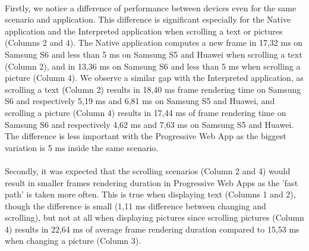 \documentclass{kththesis}
\begin{document}
\paragraph{}
Firstly, we notice a difference of performance between devices even for the same scenario and application. This difference is significant especially for the Native application and the Interpreted application when scrolling a text or pictures (Columns 2 and 4). The Native application computes a new frame in 17,32 ms on Samsung S6 and less than 5 ms on Samsung S5 and Huawei when scrolling a text (Column 2), and in 13,36 ms on Samsung S6 and less than 5 ms when scrolling a picture (Column 4). We observe a similar gap with the Interpreted application, as scrolling a text (Column 2) results in 18,40 ms frame rendering time on Samsung S6 and respectively 5,19 ms and 6,81 ms on Samsung S5 and Huawei, and scrolling a picture (Column 4) results in 17,44 ms of frame rendering time on Samsung S6 and respectively 4,62 ms and 7,63 ms on Samsung S5 and Huawei. \newline
The difference is less important with the Progressive Web App as the biggest variation is 5 ms inside the same scenario. 


\paragraph{}
Secondly, it was expected that the scrolling scenarios (Column 2 and 4) would result in smaller frames rendering duration in Progressive Web Apps as the 'fast path' is taken more often. This is true when displaying text (Columns 1 and 2), though the difference is small (1,11 ms difference between changing and scrolling), but not at all when displaying pictures since scrolling pictures (Column 4) results in 22,64 ms of average frame rendering duration compared to 15,53 ms when changing a picture (Column 3). 
\end{document}
